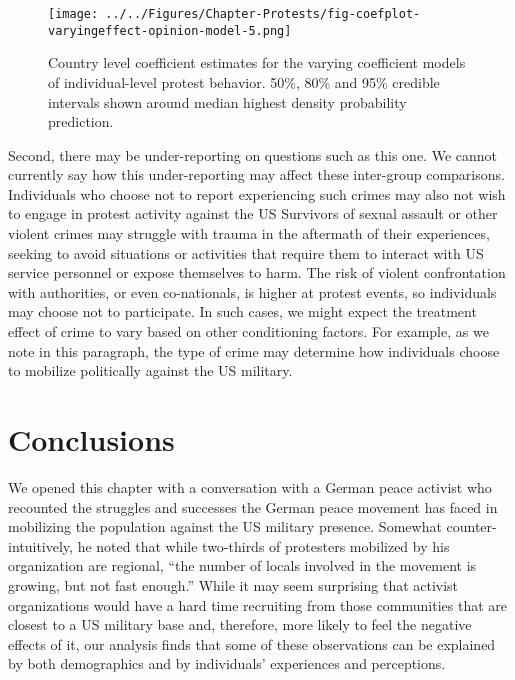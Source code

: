 			
			
			
			\begin{figure}[t]
				\centering\texttt{[image: ../../Figures/Chapter-Protests/fig-coefplot-varyingeffect-opinion-model-5.png]}
				\caption{Country level coefficient estimates for the varying coefficient models of individual-level protest behavior. 50\%, 80\% and 95\% credible intervals shown around median highest density probability prediction.}
				\label{fig:coefplot-varying-coefficients}
			\end{figure}
			
			Second, there may be under-reporting on questions such as this one. We cannot currently say how this under-reporting may affect these inter-group comparisons. Individuals who choose not to report experiencing such crimes may also not wish to engage in protest activity against the US Survivors of sexual assault or other violent crimes may struggle with trauma in the aftermath of their experiences, seeking to avoid situations or activities that require them to interact with US service personnel or expose themselves to harm. The risk of violent confrontation with authorities, or even co-nationals, is higher at protest events, so individuals may choose not to participate. In such cases, we might expect the treatment effect of crime to vary based on other conditioning factors. For example, as we note in this paragraph, the type of crime may determine how individuals choose to mobilize politically against the US military.
			
			
			\section*{Conclusions}
			
			
			
			We opened this chapter with a conversation with a German peace activist who recounted the struggles and successes the German peace movement has faced in mobilizing the population against the US military presence. Somewhat counter-intuitively, he noted that while two-thirds of protesters mobilized by his organization are regional, ``the number of locals involved in the movement is growing, but not fast enough.''\cite{berlinone20190723} While it may seem surprising that activist organizations would have a hard time recruiting from those communities that are closest to a US military base and, therefore, more likely to feel the negative effects of it, our analysis finds that some of these observations can be explained by both demographics and by individuals' experiences and perceptions.    
			
